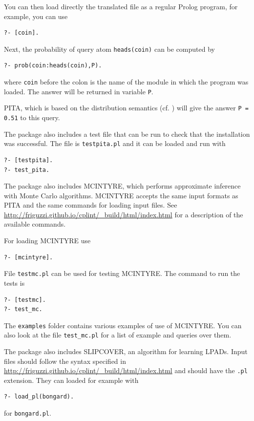 You can then load directly the translated file as a regular
Prolog program, for example, you can use
\begin{verbatim}
?- [coin].
\end{verbatim}

Next, the probability of query atom \texttt{heads(coin)} can be
computed by
\begin{verbatim}
?- prob(coin:heads(coin),P).
\end{verbatim} 
where \texttt{coin} before the colon is the name of the module in which the program was loaded.  
The answer will be returned in variable \texttt{P}.


PITA, which is based on the distribution semantics
(cf. \cite{Sato95astatistical}) will give the answer {\tt P = 0.51} to
this query.  

The package also includes a test file that can be run to check that the installation was successful. 
The file is \texttt{testpita.pl} and it can be loaded and run with
\begin{verbatim}
?- [testpita].
?- test_pita.
\end{verbatim} 
The package also includes MCINTYRE, which performs approximate inference with Monte Carlo algorithms.
MCINTYRE accepts the same input formats as PITA and the same commands for loading input files.
See \url{http://friguzzi.github.io/cplint/_build/html/index.html} for a description of the available commands.

For loading MCINTYRE use
\begin{verbatim}
?- [mcintyre].
\end{verbatim} 

File \texttt{testmc.pl} can be used for testing MCINTYRE. The command to run the tests is
\begin{verbatim}
?- [testmc].
?- test_mc.
\end{verbatim} 
The \texttt{examples} folder contains various examples of use of MCINTYRE. You can 
also look at the file \texttt{test\_mc.pl} for a list of example and queries over them.

The package also includes SLIPCOVER, an algorithm for learning LPADs. Input files should 
follow the syntax specified in \url{http://friguzzi.github.io/cplint/_build/html/index.html} and should have the
\texttt{.pl} extension. They can loaded for example with
\begin{verbatim}
?- load_pl(bongard).
\end{verbatim}
for \texttt{bongard.pl}.

